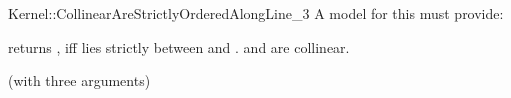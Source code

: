 \begin{ccRefFunctionObjectConcept}{Kernel::CollinearAreStrictlyOrderedAlongLine_3}
A model for this must provide:


         {returns , iff  lies strictly between 
          and . \ccPrecond {} and 
          are collinear.}

\ccRefines
{} (with three arguments)

\ccSeeAlso

  \\


\end{ccRefFunctionObjectConcept}
